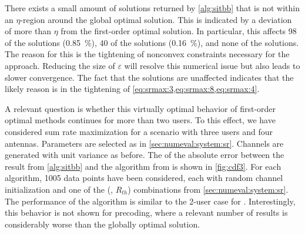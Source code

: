 \documentclass[a4paper,10pt,journal]{IEEEtran}
\begin{document}
There exists a small amount of solutions returned by \cref{alg:sitbb} that is not within an $\eta$-region around the global optimal solution. This is indicated by a deviation of more than $\eta$ from the first-order optimal solution. In particular, this affects 98 of the  solutions (\SI{0.85}{\percent}), 40 of the  solutions (\SI{0.16}{\percent}), and none of the  solutions. The reason for this is the tightening of nonconvex constraints necessary for the  approach. Reducing the size of $\varepsilon$ will resolve this numerical issue but also leads to slower convergence. The fact that the  solutions are unaffected indicates that the likely reason is in the tightening of \cref{eq:srmax:3,eq:srmax:8,eq:srmax:4}.

A relevant question is whether this virtually optimal behavior of first-order optimal methods continues for more than two users. To this effect, we have considered sum rate maximization for a scenario with three users and four antennas. Parameters are selected as in \cref{sec:numeval:system:sr}. Channels are generated with unit variance as before. The  of the absolute error between the result from \cref{alg:sitbb} and the  algorithm from \cite{mao2017eurasip} is shown in \cref{fig:cdf3}. For each algorithm, \num{1005} data points have been considered, each with random channel initialization and one of the (, $R_{th}$) combinations from \cref{sec:numeval:system:sr}. The performance of the  algorithm is similar to the 2-user case for . Interestingly, this behavior is not shown for  precoding, where a relevant number of  results is considerably worse than the globally optimal solution.
\end{document}
